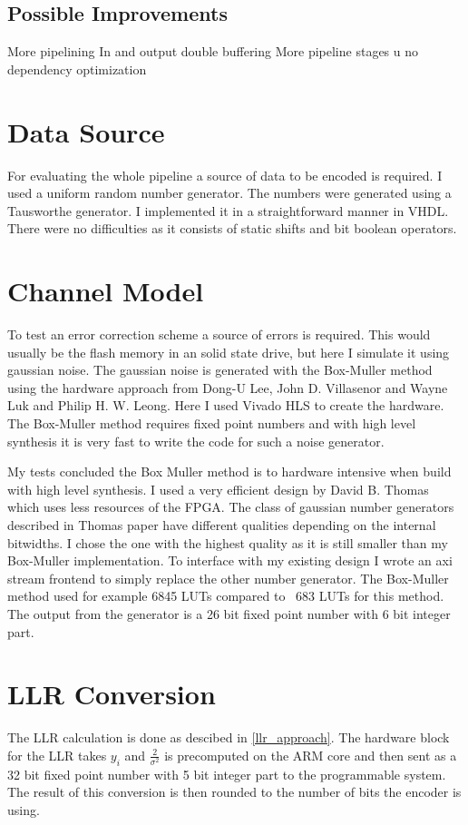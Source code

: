 \subsection{Possible Improvements}
More pipelining
In and output double buffering
More pipeline stages
u no dependency optimization

\section{Data Source}
For evaluating the whole pipeline a source of data to be encoded is required. I used a uniform random number generator. The numbers were generated using a Tausworthe generator\cite{Ec96}. I implemented it in a straightforward manner in VHDL. There were no difficulties as it consists of static shifts and bit boolean operators.

\section{Channel Model}
To test an error correction scheme a source of errors is required. This would usually be the flash memory in an solid state drive, but here I simulate it using gaussian noise. The gaussian noise is generated with the Box-Muller method using the hardware approach from Dong-U Lee, John D. Villasenor and Wayne Luk and Philip H. W. Leong\cite{LeVi06}. Here I used Vivado HLS to create the hardware. The Box-Muller method requires fixed point numbers and with high level synthesis it is very fast to write the code for such a noise generator.

My tests concluded the Box Muller method is to hardware intensive when build with high level synthesis. I used a very efficient design by David B. Thomas\cite{Th14} which uses less resources of the FPGA. The class of gaussian number generators described in Thomas paper have different qualities depending on the internal bitwidths. I chose the one with the highest quality as it is still smaller than my Box-Muller implementation. To interface with my existing design I wrote an axi stream frontend to simply replace the other number generator. The Box-Muller method used for example 6845 LUTs compared to ~683 LUTs for this method. The output from the generator is a 26 bit fixed point number with 6 bit integer part.

\section{LLR Conversion}
The LLR calculation is done as descibed in \cref{llr_approach}. The hardware block for the LLR takes $y_i$ and $\frac{2}{\sigma^2}$ is precomputed on the ARM core and then sent as a 32 bit fixed point number with 5 bit integer part to the programmable system. The result of this conversion is then rounded to the number of bits the encoder is using.

